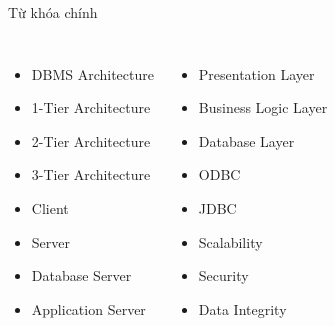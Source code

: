\documentclass[aspectratio=169,11pt]{beamer}
\newcommand{\tightlist}{\setlength{\itemsep}{2pt}\setlength{\parskip}{0pt}}
\begin{document}
\begin{frame}{Từ khóa chính}
\small
\begin{columns}[T]
\begin{itemize}\tightlist
  \item DBMS Architecture
  \item 1-Tier Architecture
  \item 2-Tier Architecture
  \item 3-Tier Architecture
  \item Client
  \item Server
  \item Database Server
  \item Application Server
\end{itemize}

\begin{itemize}\tightlist
  \item Presentation Layer
  \item Business Logic Layer
  \item Database Layer
  \item ODBC
  \item JDBC
  \item Scalability
  \item Security
  \item Data Integrity
\end{itemize}
\end{columns}
\end{frame}
\end{document}

